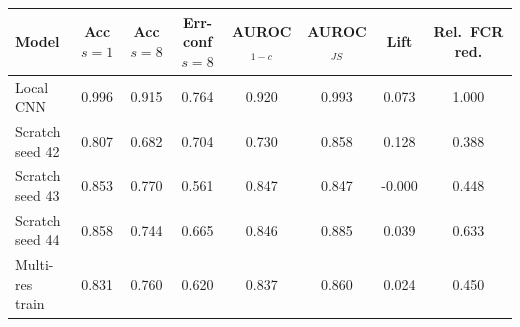 \begin{tabular}{lccccccc}
\toprule
Model & Acc $s{=}1$ & Acc $s{=}8$ & Err-conf $s{=}8$ & AUROC$_{1-c}$ & AUROC$_{JS}$ & Lift & Rel.\ FCR red.\\
\midrule
Local CNN & 0.996 & 0.915 & 0.764 & 0.920 & 0.993 & 0.073 & 1.000\\
Scratch seed 42 & 0.807 & 0.682 & 0.704 & 0.730 & 0.858 & 0.128 & 0.388\\
Scratch seed 43 & 0.853 & 0.770 & 0.561 & 0.847 & 0.847 & -0.000 & 0.448\\
Scratch seed 44 & 0.858 & 0.744 & 0.665 & 0.846 & 0.885 & 0.039 & 0.633\\
Multi-res train & 0.831 & 0.760 & 0.620 & 0.837 & 0.860 & 0.024 & 0.450\\
\bottomrule
\end{tabular}
